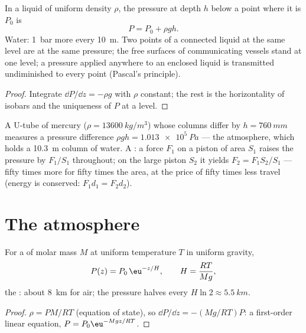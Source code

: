 \begin{corollary}\label{cor:b1:fluid-statics:incompressible}
In a liquid of uniform density $\rho$, the pressure at depth $h$ below a
point where it is $P_0$ is
\[
P = P_0 + \rho gh .
\]
Water: \qty{1}{bar} more every \qty{10}{m}. Two points of a connected
liquid at the same level are at the same pressure; the free surfaces of
communicating vessels stand at one level; a pressure applied anywhere
to an enclosed liquid is transmitted undiminished to every point
(Pascal's principle).
\end{corollary}

\begin{proof}
Integrate $\dd P/\dd z = -\rho g$ with $\rho$ constant; the rest is the
horizontality of isobars and the uniqueness of $P$ at a level.
\end{proof}

\begin{example}\label{ex:b1:fluid-statics:manometer}
A U-tube of mercury ($\rho = \qty{13600}{kg/m^3}$) whose columns differ by
$h = \qty{760}{mm}$ measures a pressure difference $\rho gh = \qty{1.013e5}{Pa}$
--- the atmosphere, which holds a \qty{10.3}{m} column of water. A
: a force $F_1$ on a piston of area $S_1$ raises the
pressure by $F_1/S_1$ throughout; on the large piston $S_2$ it yields
$F_2 = F_1S_2/S_1$ --- fifty times more for fifty times the area, at the
price of fifty times less travel (energy is conserved: $F_1d_1 = F_2d_2$).
\end{example}

\section{The atmosphere}

\begin{proposition}\label{prop:b1:fluid-statics:atmosphere}
For a  of molar mass $M$ at uniform temperature $T$ in uniform
gravity,
\[
P(z) = P_0\,\eu^{-z/H}, \qquad H = \frac{RT}{Mg} ,
\]
the \emph{}: about \qty{8}{km} for air; the pressure halves
every $H\ln2 \approx \qty{5.5}{km}$.
\end{proposition}

\begin{proof}
$\rho = PM/RT$ (equation of state), so $\dd P/\dd z = -(Mg/RT)P$: a
first-order linear equation, $P = P_0\eu^{-Mgz/RT}$.
\end{proof}

